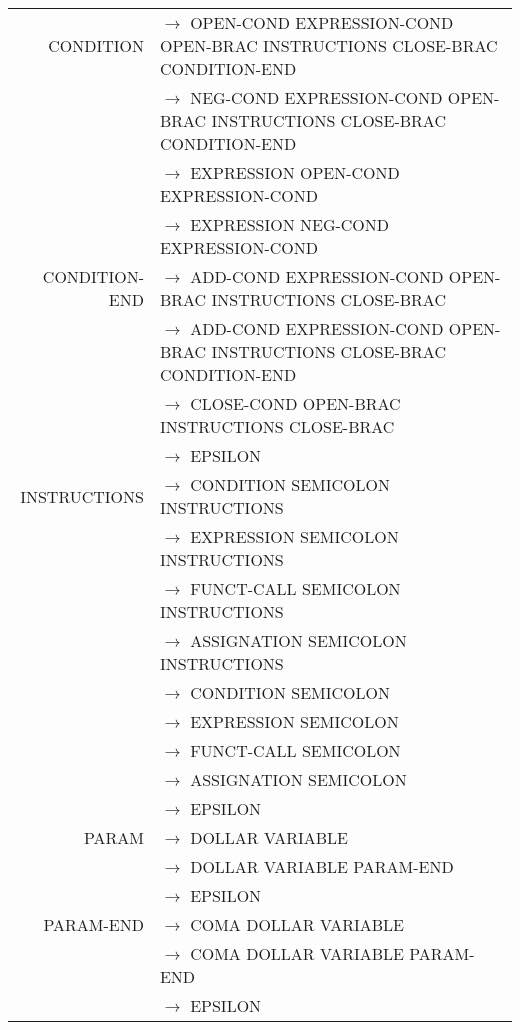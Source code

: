 \documentclass[a4paper,10pt]{article}
\begin{document}
\begin{center}
\begin{longtable}{rl}
CONDITION			& $\rightarrow$ OPEN-COND EXPRESSION-COND OPEN-BRAC INSTRUCTIONS CLOSE-BRAC CONDITION-END\\
					& $\rightarrow$ NEG-COND EXPRESSION-COND OPEN-BRAC INSTRUCTIONS CLOSE-BRAC CONDITION-END\\
					& $\rightarrow$ EXPRESSION OPEN-COND EXPRESSION-COND \\
					& $\rightarrow$ EXPRESSION NEG-COND EXPRESSION-COND \\


CONDITION-END		& $\rightarrow$ ADD-COND EXPRESSION-COND OPEN-BRAC INSTRUCTIONS CLOSE-BRAC \\
					& $\rightarrow$ ADD-COND EXPRESSION-COND OPEN-BRAC INSTRUCTIONS CLOSE-BRAC CONDITION-END \\
					& $\rightarrow$ CLOSE-COND OPEN-BRAC INSTRUCTIONS CLOSE-BRAC\\
					& $\rightarrow$ EPSILON \\
					
					
					
					
					
INSTRUCTIONS		& $\rightarrow$ CONDITION SEMICOLON INSTRUCTIONS\\
					& $\rightarrow$ EXPRESSION SEMICOLON INSTRUCTIONS\\
					& $\rightarrow$ FUNCT-CALL SEMICOLON INSTRUCTIONS\\
					& $\rightarrow$ ASSIGNATION SEMICOLON INSTRUCTIONS\\
					& $\rightarrow$ CONDITION SEMICOLON \\
					& $\rightarrow$ EXPRESSION SEMICOLON \\
					& $\rightarrow$ FUNCT-CALL SEMICOLON \\
					& $\rightarrow$ ASSIGNATION SEMICOLON \\
					& $\rightarrow$ EPSILON \\
					
					
					
PARAM				& $\rightarrow$ DOLLAR VARIABLE \\
					& $\rightarrow$ DOLLAR VARIABLE PARAM-END\\
					& $\rightarrow$ EPSILON \\
PARAM-END			& $\rightarrow$ COMA DOLLAR VARIABLE \\ 
					& $\rightarrow$ COMA DOLLAR VARIABLE PARAM-END\\ 
					& $\rightarrow$ EPSILON \\




\end{longtable}
\end{center}
\end{document}
